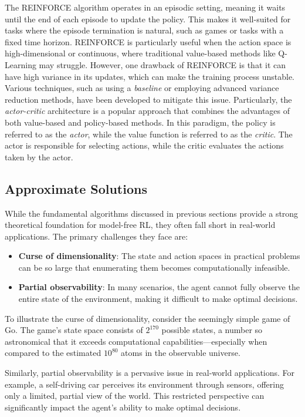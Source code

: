 The REINFORCE algorithm operates in an episodic setting, 
 meaning it waits until the end of each episode to update the policy. 
 This makes it well-suited for tasks where the episode termination is natural, such as games or tasks with a fixed time horizon.
 REINFORCE is particularly useful when the action space is high-dimensional or continuous, where traditional value-based methods like Q-Learning may struggle.  
 However, one drawback of REINFORCE is that it can have high variance in its updates, which can make the training process unstable. 
 Various techniques, such as using a \emph{baseline} or employing advanced variance reduction methods, have been developed to mitigate this issue.
 Particularly, the \emph{actor-critic} architecture is a popular approach that combines the advantages of both value-based and policy-based methods.
 In this paradigm, the policy is referred to as the \emph{actor}, while the value function is referred to as the \emph{critic}.
The actor is responsible for selecting actions, while the critic evaluates the actions taken by the actor.

\subsection{Approximate Solutions}

While the fundamental algorithms discussed in previous sections provide a strong theoretical foundation for model-free RL, 
 they often fall short in real-world applications. 
 The primary challenges they face are:

\begin{itemize}
  \item \textbf{Curse of dimensionality}: The state and action spaces in practical problems can be so large that enumerating them becomes computationally infeasible.
  \item \textbf{Partial observability}: In many scenarios, the agent cannot fully observe the entire state of the environment, 
  making it difficult to make optimal decisions.
\end{itemize}
To illustrate the curse of dimensionality, 
 consider the seemingly simple game of Go. 
 The game's state space consists of \(2^{170}\) possible states, 
 a number so astronomical that it exceeds computational capabilities—especially when compared to the estimated \(10^{80}\) atoms in the observable universe.

Similarly, partial observability is a pervasive issue in real-world applications. 
 For example, a self-driving car perceives its environment through sensors, 
 offering only a limited, partial view of the world. 
 This restricted perspective can significantly impact the agent's ability to make optimal decisions.


